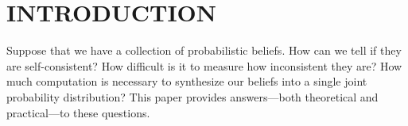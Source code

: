 \documentclass[twoside]{article}
\begin{document}



\section{INTRODUCTION}

Suppose that we have a collection of probabilistic beliefs. 
How can we tell if they are self-consistent?
How difficult is it to measure how inconsistent they are?
How much computation is necessary to synthesize our beliefs into a single joint probability distribution?
This paper provides answers---both
theoretical and practical---to these questions. 
\end{document}
